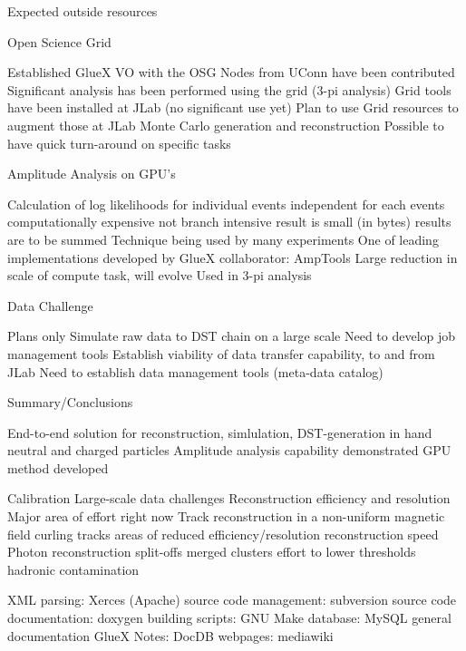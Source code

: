 
Expected outside resources


Open Science Grid

\I Established GlueX VO with the OSG
\I Nodes from UConn have been contributed
\I Significant analysis has been performed using the grid (3-pi analysis)
\I Grid tools have been installed at JLab (no significant use yet)
\I Plan to use Grid resources to augment those at JLab
   \I Monte Carlo generation and reconstruction
   \I Possible to have quick turn-around on specific tasks


Amplitude Analysis on GPU's

\I Calculation of log likelihoods for individual events
   \I independent for each events
   \I computationally expensive
   \I not branch intensive
   \I result is small (in bytes)
   \I results are to be summed
\I Technique being used by many experiments
   \I One of leading implementations developed by GlueX collaborator: AmpTools
\I Large reduction in scale of compute task, will evolve
\I Used in 3-pi analysis


Data Challenge

\I Plans only
\I Simulate raw data to DST chain on a large scale
   \I Need to develop job management tools
\I Establish viability of data transfer capability, to and from JLab
   \I Need to establish data management tools (meta-data catalog)


Summary/Conclusions

\I End-to-end solution for reconstruction, simlulation, DST-generation in hand
   \I neutral and charged particles
\I Amplitude analysis capability demonstrated
   \I GPU method developed

\I Calibration
\I Large-scale data challenges
\I Reconstruction efficiency and resolution
   \I Major area of effort right now
   \I Track reconstruction in a non-uniform magnetic field
      \I curling tracks
      \I areas of reduced efficiency/resolution
      \I reconstruction speed
   \I Photon reconstruction
      \I split-offs
      \I merged clusters
      \I effort to lower thresholds
      \I hadronic contamination


\f{
\bi
\I XML parsing: Xerces (Apache)
\I source code management: subversion
\I source code documentation: doxygen
\I building scripts: GNU Make
\I database: MySQL
\I general documentation
  \bi
  \I GlueX Notes: DocDB
  \I webpages: mediawiki
  \ei
\ei
}
